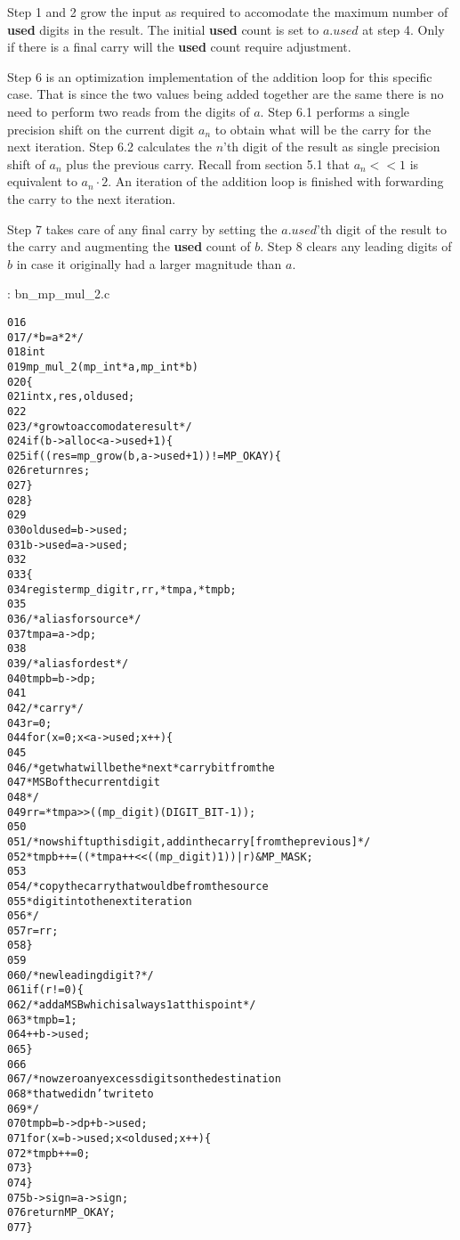 \documentclass[b5paper]{book}
\begin{document}
Step 1 and 2 grow the input as required to accomodate the maximum number of \textbf{used} digits in the result.  The initial \textbf{used} count
is set to $a.used$ at step 4.  Only if there is a final carry will the \textbf{used} count require adjustment.

Step 6 is an optimization implementation of the addition loop for this specific case.  That is since the two values being added together 
are the same there is no need to perform two reads from the digits of $a$.  Step 6.1 performs a single precision shift on the current digit $a_n$ to
obtain what will be the carry for the next iteration.  Step 6.2 calculates the $n$'th digit of the result as single precision shift of $a_n$ plus
the previous carry.  Recall from section 5.1 that $a_n << 1$ is equivalent to $a_n \cdot 2$.  An iteration of the addition loop is finished with 
forwarding the carry to the next iteration.

Step 7 takes care of any final carry by setting the $a.used$'th digit of the result to the carry and augmenting the \textbf{used} count of $b$.  
Step 8 clears any leading digits of $b$ in case it originally had a larger magnitude than $a$.

\vspace{+3mm}\begin{small}
\hspace{-5.1mm}{\bf File}: bn\_mp\_mul\_2.c
\vspace{-3mm}
\begin{alltt}
016   
017   /* b = a*2 */
018   int
019   mp_mul_2 (mp_int * a, mp_int * b)
020   \{
021     int     x, res, oldused;
022   
023     /* grow to accomodate result */
024     if (b->alloc < a->used + 1) \{
025       if ((res = mp_grow (b, a->used + 1)) != MP_OKAY) \{
026         return res;
027       \}
028     \}
029   
030     oldused = b->used;
031     b->used = a->used;
032   
033     \{
034       register mp_digit r, rr, *tmpa, *tmpb;
035   
036       /* alias for source */
037       tmpa = a->dp;
038       
039       /* alias for dest */
040       tmpb = b->dp;
041   
042       /* carry */
043       r = 0;
044       for (x = 0; x < a->used; x++) \{
045       
046         /* get what will be the *next* carry bit from the 
047          * MSB of the current digit 
048          */
049         rr = *tmpa >> ((mp_digit)(DIGIT_BIT - 1));
050         
051         /* now shift up this digit, add in the carry [from the previous] */
052         *tmpb++ = ((*tmpa++ << ((mp_digit)1)) | r) & MP_MASK;
053         
054         /* copy the carry that would be from the source 
055          * digit into the next iteration 
056          */
057         r = rr;
058       \}
059   
060       /* new leading digit? */
061       if (r != 0) \{
062         /* add a MSB which is always 1 at this point */
063         *tmpb = 1;
064         ++b->used;
065       \}
066   
067       /* now zero any excess digits on the destination 
068        * that we didn't write to 
069        */
070       tmpb = b->dp + b->used;
071       for (x = b->used; x < oldused; x++) \{
072         *tmpb++ = 0;
073       \}
074     \}
075     b->sign = a->sign;
076     return MP_OKAY;
077   \}
\end{alltt}
\end{small}
\end{document}
